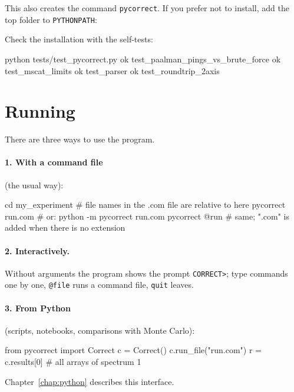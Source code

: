 \documentclass[11pt,a4paper]{report}
\newcommand{\cmd}[1]{\texttt{\color{accent}#1}}
\newcommand{\code}[1]{\texttt{#1}}
\begin{document}
This also creates the command \code{pycorrect}. If you prefer not to install,
add the top folder to \code{PYTHONPATH}:


Check the installation with the self-tests:

\begin{shell}
python tests/test_pycorrect.py
ok  test_paalman_pings_vs_brute_force
ok  test_mscat_limits
ok  test_parser
ok  test_roundtrip_2axis
\end{shell}

\section{Running}

There are three ways to use the program.

\paragraph{1. With a command file} (the usual way):
\begin{shell}
cd my_experiment            # file names in the .com file are relative to here
pycorrect run.com           # or: python -m pycorrect run.com
pycorrect @run              # same; ".com" is added when there is no extension
\end{shell}

\paragraph{2. Interactively.} Without arguments the program shows the prompt
\code{CORRECT>}; type commands one by one, \code{@file} runs a command file,
\cmd{quit} leaves.

\paragraph{3. From Python} (scripts, notebooks, comparisons with Monte Carlo):
\begin{py}
from pycorrect import Correct
c = Correct()
c.run_file("run.com")
r = c.results[0]          # all arrays of spectrum 1
\end{py}
Chapter~\ref{chap:python} describes this interface.
\end{document}
